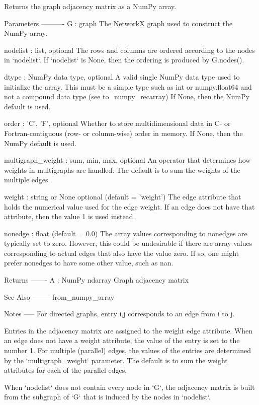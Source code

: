 \begin{DoxyVerb}Returns the graph adjacency matrix as a NumPy array.

Parameters
----------
G : graph
    The NetworkX graph used to construct the NumPy array.

nodelist : list, optional
    The rows and columns are ordered according to the nodes in `nodelist`.
    If `nodelist` is None, then the ordering is produced by G.nodes().

dtype : NumPy data type, optional
    A valid single NumPy data type used to initialize the array.
    This must be a simple type such as int or numpy.float64 and
    not a compound data type (see to_numpy_recarray)
    If None, then the NumPy default is used.

order : {'C', 'F'}, optional
    Whether to store multidimensional data in C- or Fortran-contiguous
    (row- or column-wise) order in memory. If None, then the NumPy default
    is used.

multigraph_weight : {sum, min, max}, optional
    An operator that determines how weights in multigraphs are handled.
    The default is to sum the weights of the multiple edges.

weight : string or None optional (default = 'weight')
    The edge attribute that holds the numerical value used for
    the edge weight. If an edge does not have that attribute, then the
    value 1 is used instead.

nonedge : float (default = 0.0)
    The array values corresponding to nonedges are typically set to zero.
    However, this could be undesirable if there are array values
    corresponding to actual edges that also have the value zero. If so,
    one might prefer nonedges to have some other value, such as nan.

Returns
-------
A : NumPy ndarray
    Graph adjacency matrix

See Also
--------
from_numpy_array

Notes
-----
For directed graphs, entry i,j corresponds to an edge from i to j.

Entries in the adjacency matrix are assigned to the weight edge attribute.
When an edge does not have a weight attribute, the value of the entry is
set to the number 1.  For multiple (parallel) edges, the values of the
entries are determined by the `multigraph_weight` parameter. The default is
to sum the weight attributes for each of the parallel edges.

When `nodelist` does not contain every node in `G`, the adjacency matrix is
built from the subgraph of `G` that is induced by the nodes in `nodelist`.


\end{DoxyVerb}

